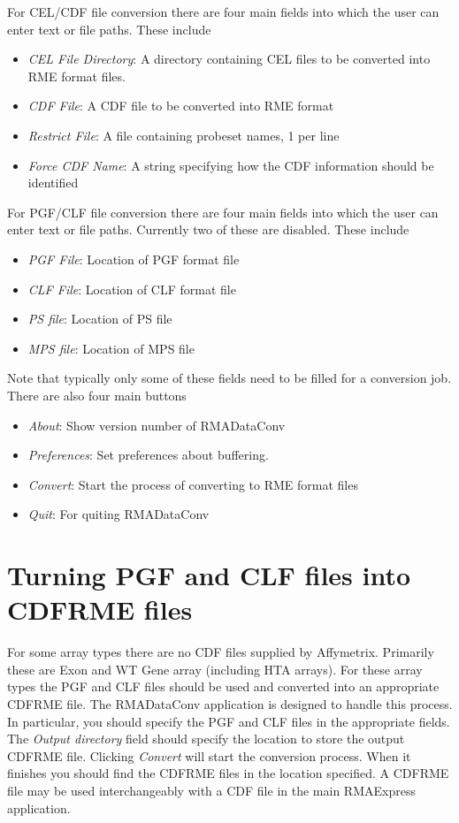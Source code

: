 \documentclass[11pt]{report}
\begin{document}
For CEL/CDF file conversion there are four main fields into which the user can enter text or file paths. These include
\begin{itemize}
\item {\it CEL File Directory}: A directory containing CEL files to be converted into RME format files.
\item {\it CDF File}: A CDF file to be converted into RME format
\item {\it Restrict File}: A file containing probeset names, 1 per line
\item {\it Force CDF Name}: A string specifying how the CDF information should be identified 
\end{itemize}

For PGF/CLF file conversion there are four main fields into which the user can enter text or file paths. Currently two of these are disabled. These include
\begin{itemize}
\item {\it PGF File}: Location of PGF format file
\item {\it CLF File}: Location of CLF format file
\item {\it PS file}: Location of PS file
\item {\it MPS file}: Location of MPS file
\end{itemize}


Note that typically only some of these fields need to be filled for a conversion job. There are also four main buttons
\begin{itemize}
\item {\it About}: Show version number of RMADataConv
\item {\it Preferences}: Set preferences about buffering.
\item {\it Convert}: Start the process of converting to RME format files
\item {\it Quit}: For quiting RMADataConv
\end{itemize}

\section{Turning PGF and CLF files into CDFRME files}

For some array types there are no CDF files supplied by Affymetrix. Primarily these are Exon and WT Gene array (including HTA arrays). For these array types the PGF and CLF files should be used and converted into an appropriate CDFRME file. The RMADataConv application is designed to handle this process. In particular, you should specify the PGF and CLF files in the appropriate fields. The {\it Output directory} field should specify the location to store the output CDFRME file. Clicking {\it Convert} will start the conversion process. When it finishes you should find the CDFRME files in the location specified. A CDFRME file may be used interchangeably with a CDF file in the main RMAExpress application.
\end{document}
